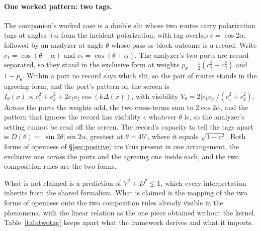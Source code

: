 \paragraph{One worked pattern: two tags.} The companion's worked case is a double slit whose two routes carry polarization tags at angles $\pm\alpha$ from the incident polarization, with tag overlap $c = \cos 2\alpha$, followed by an analyzer at angle $\theta$ whose pass-or-block outcome is a record. Write $c_1 = \cos(\theta - \alpha)$ and $c_2 = \cos(\theta + \alpha)$. The analyzer's two ports are record-separated, so they stand in the exclusive form at weights $p_\theta = \tfrac12(c_1^2 + c_2^2)$ and $1 - p_\theta$. Within a port no record says which slit, so the pair of routes stands in the agreeing form, and the port's pattern on the screen is $I_\theta(x) \propto c_1^2 + c_2^2 + 2 c_1 c_2 \cos(k\Delta(x))$, with visibility $V_\theta = 2|c_1 c_2|/(c_1^2 + c_2^2)$. Across the ports the weights add, the two cross-terms sum to $2\cos 2\alpha$, and the pattern that ignores the record has visibility $c$ whatever $\theta$ is, so the analyzer's setting cannot be read off the screen. The record's capacity to tell the tags apart is $D(\theta) = |\sin 2\theta| \sin 2\alpha$, greatest at $\theta = 45^\circ$, where it equals $\sqrt{1 - c^2}$. Both forms of openness of \S\ref{sec:positive} are thus present in one arrangement, the exclusive one across the ports and the agreeing one inside each, and the two composition rules are the two forms.

What is not claimed is a prediction of $V^2 + D^2 \le 1$, which every interpretation inherits from the shared formalism. What is claimed is the mapping of the two forms of openness onto the two composition rules already visible in the phenomena, with the linear relation as the one piece obtained without the kernel. Table~\ref{tab:twotag} keeps apart what the framework derives and what it imports.

